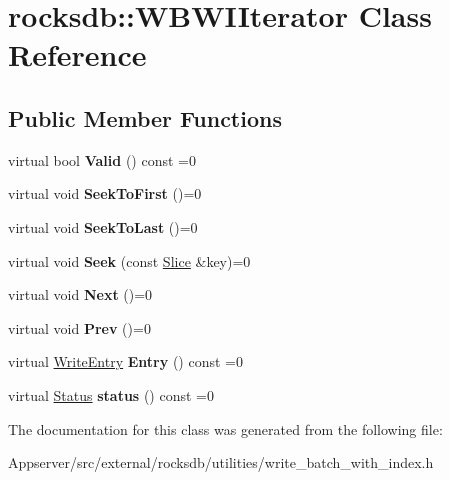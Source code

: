 \hypertarget{classrocksdb_1_1WBWIIterator}{}\section{rocksdb\+:\+:W\+B\+W\+I\+Iterator Class Reference}
\label{classrocksdb_1_1WBWIIterator}
\subsection*{Public Member Functions}
\begin{DoxyCompactItemize}
\item 
virtual bool {\bfseries Valid} () const =0\hypertarget{classrocksdb_1_1WBWIIterator_a95f4839d469147968d31607dd62a6aeb}{}\label{classrocksdb_1_1WBWIIterator_a95f4839d469147968d31607dd62a6aeb}

\item 
virtual void {\bfseries Seek\+To\+First} ()=0\hypertarget{classrocksdb_1_1WBWIIterator_ae2f06f608ae0644db80c31fb628ad938}{}\label{classrocksdb_1_1WBWIIterator_ae2f06f608ae0644db80c31fb628ad938}

\item 
virtual void {\bfseries Seek\+To\+Last} ()=0\hypertarget{classrocksdb_1_1WBWIIterator_a426dd4a319b6f38371c77bb1195a5864}{}\label{classrocksdb_1_1WBWIIterator_a426dd4a319b6f38371c77bb1195a5864}

\item 
virtual void {\bfseries Seek} (const \hyperlink{classrocksdb_1_1Slice}{Slice} \&key)=0\hypertarget{classrocksdb_1_1WBWIIterator_ab24177386e5d85820f4a0175cb8775d6}{}\label{classrocksdb_1_1WBWIIterator_ab24177386e5d85820f4a0175cb8775d6}

\item 
virtual void {\bfseries Next} ()=0\hypertarget{classrocksdb_1_1WBWIIterator_a7d559533efd7083cff79c46eb5f3d73e}{}\label{classrocksdb_1_1WBWIIterator_a7d559533efd7083cff79c46eb5f3d73e}

\item 
virtual void {\bfseries Prev} ()=0\hypertarget{classrocksdb_1_1WBWIIterator_addc4993a2d19c98ea3328b23f06b4adf}{}\label{classrocksdb_1_1WBWIIterator_addc4993a2d19c98ea3328b23f06b4adf}

\item 
virtual \hyperlink{structrocksdb_1_1WriteEntry}{Write\+Entry} {\bfseries Entry} () const =0\hypertarget{classrocksdb_1_1WBWIIterator_a5078ed5d340330a5f015dd9375dd6e79}{}\label{classrocksdb_1_1WBWIIterator_a5078ed5d340330a5f015dd9375dd6e79}

\item 
virtual \hyperlink{classrocksdb_1_1Status}{Status} {\bfseries status} () const =0\hypertarget{classrocksdb_1_1WBWIIterator_a8e59e498f8075890219ea81f8a9d4eda}{}\label{classrocksdb_1_1WBWIIterator_a8e59e498f8075890219ea81f8a9d4eda}

\end{DoxyCompactItemize}


The documentation for this class was generated from the following file\+:\begin{DoxyCompactItemize}
\item 
Appserver/src/external/rocksdb/utilities/write\+\_\+batch\+\_\+with\+\_\+index.\+h\end{DoxyCompactItemize}
